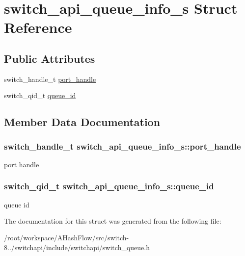 \hypertarget{structswitch__api__queue__info__s}{\section{switch\+\_\+api\+\_\+queue\+\_\+info\+\_\+s Struct Reference}
\label{structswitch__api__queue__info__s}
}
\subsection*{Public Attributes}
\begin{DoxyCompactItemize}
\item 
switch\+\_\+handle\+\_\+t \hyperlink{structswitch__api__queue__info__s_ab50dc146bee2d6ae2a11b61dee3241ec}{port\+\_\+handle}
\item 
switch\+\_\+qid\+\_\+t \hyperlink{structswitch__api__queue__info__s_a5396f3f6f9b97a5574b76b9a79a02e84}{queue\+\_\+id}
\end{DoxyCompactItemize}


\subsection{Member Data Documentation}
\hypertarget{structswitch__api__queue__info__s_ab50dc146bee2d6ae2a11b61dee3241ec}{
\subsubsection[{port\+\_\+handle}]{\setlength{\rightskip}{0pt plus 5cm}switch\+\_\+handle\+\_\+t switch\+\_\+api\+\_\+queue\+\_\+info\+\_\+s\+::port\+\_\+handle}}\label{structswitch__api__queue__info__s_ab50dc146bee2d6ae2a11b61dee3241ec}
port handle \hypertarget{structswitch__api__queue__info__s_a5396f3f6f9b97a5574b76b9a79a02e84}{
\subsubsection[{queue\+\_\+id}]{\setlength{\rightskip}{0pt plus 5cm}switch\+\_\+qid\+\_\+t switch\+\_\+api\+\_\+queue\+\_\+info\+\_\+s\+::queue\+\_\+id}}\label{structswitch__api__queue__info__s_a5396f3f6f9b97a5574b76b9a79a02e84}
queue id 

The documentation for this struct was generated from the following file\+:\begin{DoxyCompactItemize}
\item 
/root/workspace/\+A\+Hash\+Flow/src/switch-\/8../switchapi/include/switchapi/switch\+\_\+queue.\+h\end{DoxyCompactItemize}

